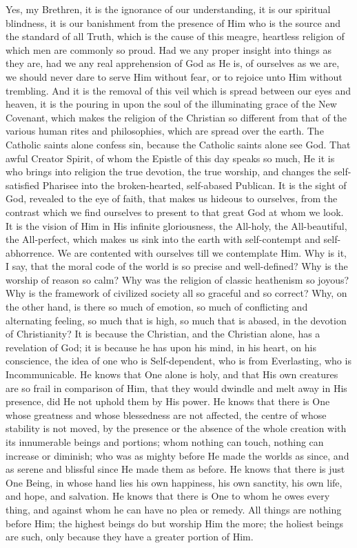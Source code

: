 Yes, my Brethren, it is the ignorance of our
understanding, it is our spiritual blindness, it is our
banishment from the presence of Him who is the source and
the standard of all Truth, which is the cause of this
meagre, heartless religion of which men are commonly so
proud. Had we any proper insight into things as they are,
had we any real apprehension of God as He is, of
ourselves as we are, we should never dare to serve Him
without fear, or to rejoice unto Him without trembling.
And it is the removal of this veil which is spread
between our eyes and heaven, it is the pouring in upon
the soul of the illuminating grace of the New Covenant,
which makes the religion of the Christian so different
from that of the various human rites and philosophies,
which are spread over the earth. The Catholic saints
alone confess sin, because the Catholic saints alone see
God. That awful Creator Spirit, of whom the Epistle of
this day speaks so much, He it is who brings into religion the true devotion, the true worship, and changes
the self-satisfied Pharisee into the broken-hearted,
self-abased Publican. It is the sight of God, revealed to
the eye of faith, that makes us hideous to ourselves,
from the contrast which we find ourselves to present to
that great God at whom we look. It is the vision of Him
in His infinite gloriousness, the All-holy, the
All-beautiful, the All-perfect, which makes us sink into
the earth with self-contempt and self-abhorrence. We are
contented with ourselves till we contemplate Him. Why is
it, I say, that the moral code of the world is so precise
and well-defined? Why is the worship of reason so calm?
Why was the religion of classic heathenism so joyous? Why
is the framework of civilized society all so graceful and
so correct? Why, on the other hand, is there so much of
emotion, so much of conflicting and alternating feeling,
so much that is high, so much that is abased, in the
devotion of Christianity? It is because the Christian,
and the Christian alone, has a revelation of God; it is
because he has upon his mind, in his heart, on his
conscience, the idea of one who is Self-dependent, who is
from Everlasting, who is Incommunicable. He knows that
One alone is holy, and that His own creatures are so
frail in comparison of Him, that they would dwindle and
melt away in His presence, did He not uphold them by His
power. He knows that there is One whose greatness and
whose blessedness are not affected, the centre of whose
stability is not moved, by the presence or the absence of
the whole creation with its innumerable beings and
portions; whom nothing can touch, nothing can increase or
diminish; who was as mighty before He made the worlds as
since, and as serene and blissful since He made them as
before. He knows that there is just One Being, in whose
hand lies his own happiness, his own sanctity, his own
life, and hope, and salvation. He knows that there is One
to whom he owes every thing, and against whom he can have
no plea or remedy. All things are nothing before Him; the
highest beings do but worship Him the more; the holiest
beings are such, only because they have a greater portion
of Him.

